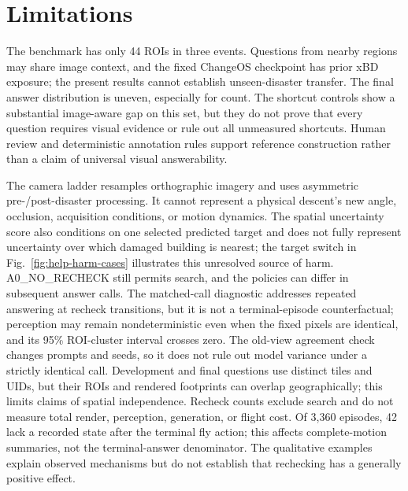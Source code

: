 \section{Limitations}
\label{sec:limitations}
The benchmark has only 44 ROIs in three events. Questions from nearby regions may share image context, and the fixed ChangeOS checkpoint has prior xBD exposure; the present results cannot establish unseen-disaster transfer. The final answer distribution is uneven, especially for count. The shortcut controls show a substantial image-aware gap on this set, but they do not prove that every question requires visual evidence or rule out all unmeasured shortcuts. Human review and deterministic annotation rules support reference construction rather than a claim of universal visual answerability.

The camera ladder resamples orthographic imagery and uses asymmetric pre-/post-disaster processing. It cannot represent a physical descent's new angle, occlusion, acquisition conditions, or motion dynamics. The spatial uncertainty score also conditions on one selected predicted target and does not fully represent uncertainty over which damaged building is nearest; the target switch in Fig.~\ref{fig:help-harm-cases} illustrates this unresolved source of harm. A0\_NO\_RECHECK still permits search, and the policies can differ in subsequent answer calls. The matched-call diagnostic addresses repeated answering at recheck transitions, but it is not a terminal-episode counterfactual; perception may remain nondeterministic even when the fixed pixels are identical, and its 95\% ROI-cluster interval crosses zero. The old-view agreement check changes prompts and seeds, so it does not rule out model variance under a strictly identical call. Development and final questions use distinct tiles and UIDs, but their ROIs and rendered footprints can overlap geographically; this limits claims of spatial independence. Recheck counts exclude search and do not measure total render, perception, generation, or flight cost. Of 3,360 episodes, 42 lack a recorded state after the terminal fly action; this affects complete-motion summaries, not the terminal-answer denominator. The qualitative examples explain observed mechanisms but do not establish that rechecking has a generally positive effect.
